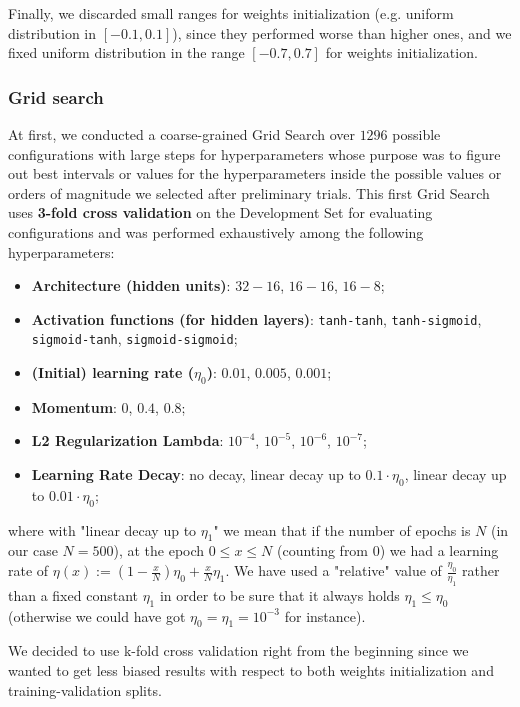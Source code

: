 Finally, we discarded small ranges for weights initialization (e.g. uniform distribution in $[-0.1, 0.1]$), since they performed worse than higher ones,
and we fixed uniform distribution in the range $[-0.7, 0.7]$ for weights initialization.

\subsubsection{Grid search}

At first, we conducted a coarse-grained Grid Search over $1296$ possible configurations with large steps for hyperparameters whose purpose was to figure out best intervals or values for the hyperparameters inside the possible values or orders of magnitude we selected after preliminary trials. This first Grid Search uses \textbf{3-fold cross validation} on the Development Set for evaluating configurations and was performed exhaustively among the following hyperparameters:
\begin{itemize}
    \item \textbf{Architecture (hidden units)}: {$32-16$, $16-16$, $16-8$};
    \item \textbf{Activation functions (for hidden layers)}: {\texttt{tanh-tanh}, \texttt{tanh-sigmoid}, \texttt{sigmoid-tanh}, \texttt{sigmoid-sigmoid}};
    \item \textbf{(Initial) learning rate ($\eta_0$)}: {$0.01$, $0.005$, $0.001$};
    \item \textbf{Momentum}: {$0$, $0.4$, $0.8$};
    \item \textbf{L2 Regularization Lambda}: {$10^{-4}$, $10^{-5}$, $10^{-6}$, $10^{-7}$};
    \item \textbf{Learning Rate Decay}: {no decay, linear decay up to $0.1 \cdot \eta_0$, linear decay up to $0.01 \cdot \eta_0$};
\end{itemize}

where with "linear decay up to $\eta_1$" we mean that if the number of epochs is $N$ (in our case $N = 500$), at the epoch $0 \leq x \le N$ (counting from $0$) we had a learning rate of $\eta(x) := \left(1 - \frac{x}{N}\right)\eta_0 + \frac{x}{N} \eta_1$. We have used a "relative" value of $\frac{\eta_0}{\eta_1}$ rather than a fixed constant $\eta_1$ in order to be sure that it always holds $\eta_1 \leq \eta_0$ (otherwise we could have got $\eta_0 = \eta_1 = 10^{-3}$ for instance).

We decided to use k-fold cross validation right from the beginning since we wanted to get less biased results with respect to both weights initialization and training-validation splits.

